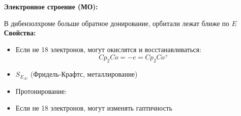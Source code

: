 \textbf{Электронное строение (МО):}\\
\begin{figure} [H]
	\centering {\texttt{[image: xx5]}}
\end{figure}
В дибензолхроме больше обратное донирование, орбитали лежат ближе по $E$ 
\textbf{Свойства:}\\
\begin{itemize}
	\item Если не 18 электронов, могут окислятся и восстанавливаться:
	\[
	Cp_2Co = -e = Cp_2Co^{+}
	\]
	\item $S_{E_{Ar}}$ (Фридель-Крафтс, металлирование)
	\item Протонирование:
	\begin{figure} [H]
		\centering {\texttt{[image: xx6]}}
	\end{figure}
	\item Если не 18 электронов, могут изменять гаптичность
\end{itemize}


